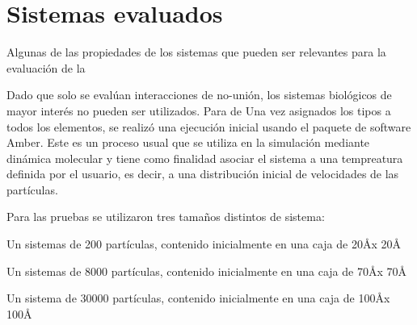 \chapter{Sistemas evaluados} \label{sistemas}

Algunas de las propiedades de los sistemas que pueden ser relevantes para la evaluación de la 

Dado que solo se evalúan interacciones de no-unión, los sistemas biológicos de mayor interés no pueden ser utilizados.
Para de
Una vez asignados los tipos a todos los elementos, se realizó una ejecución inicial usando el paquete de software Amber. 
Este es un proceso usual que se utiliza en la simulación mediante dinámica molecular y tiene como finalidad asociar el sistema a una tempreatura definida por el usuario, 
es decir, a una distribución inicial de velocidades de las partículas.

Para las pruebas se utilizaron tres tamaños distintos de sistema:

Un sistemas de 200 partículas, contenido inicialmente en una caja de 20\AA x 20\AA

Un sistemas de 8000 partículas, contenido inicialmente en una caja de 70\AA x 70\AA

Un sistema de 30000 partículas, contenido inicialmente en una caja de 100\AA x 100\AA